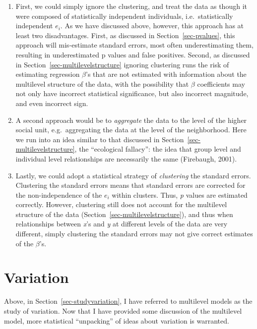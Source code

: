 \documentclass[
  letterpaper,
  DIV=11,
  numbers=noendperiod]{scrreprt}
\providecommand{\tightlist}{%
  \setlength{\itemsep}{0pt}\setlength{\parskip}{0pt}}\usepackage{longtable,booktabs,array}
\begin{document}
\begin{enumerate}
\def\labelenumi{\arabic{enumi}.}
\tightlist
\item
  First, we could simply ignore the clustering, and treat the data as
  though it were composed of statistically independent individuals,
  i.e.~statistically independent \(e_i\). As we have discussed above,
  however, this approach has at least two disadvantages. First, as
  discussed in Section~\ref{sec-pvalues}, this approach will
  mis-estimate standard errors, most often underestimating them,
  resulting in underestimated p values and false positives. Second, as
  discussed in Section~\ref{sec-multilevelstructure} ignoring clustering
  runs the risk of estimating regression \(\beta\)'s that are not
  estimated with information about the multilevel structure of the data,
  with the possibility that \(\beta\) coefficients may not only have
  incorrect statistical significance, but also incorrect magnitude, and
  even incorrect sign.
\item
  A second approach would be to \emph{aggregate} the data to the level
  of the higher social unit, e.g.~aggregating the data at the level of
  the neighborhood. Here we run into an idea similar to that discussed
  in Section~\ref{sec-multilevelstructure}, the ``ecological fallacy'':
  the idea that group level and individual level relationships are
  necessarily the same (Firebaugh, 2001).
\item
  Lastly, we could adopt a statistical strategy of \emph{clustering} the
  standard errors. Clustering the standard errors means that standard
  errors are corrected for the non-independence of the \(e_i\) within
  clusters. Thus, \emph{p} values are estimated correctly. However,
  clustering still does not account for the multilevel structure of the
  data (Section~\ref{sec-multilevelstructure}), and thus when
  relationships between \emph{x}'s and \emph{y} at different levels of
  the data are very different, simply clustering the standard errors may
  not give correct estimates of the \(\beta\)'s.
\end{enumerate}

\hypertarget{variation}{%
\section{Variation}\label{variation}}

Above, in Section~\ref{sec-studyvariation}, I have referred to
multilevel models as the study of variation. Now that I have provided
some discussion of the multilevel model, more statistical ``unpacking''
of ideas about variation is warranted.
\end{document}
